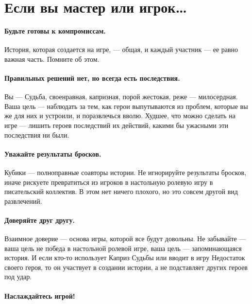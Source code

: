 \section*{Если вы мастер или игрок…}

\paragraph{Будьте готовы к компромиссам.} История, которая создается на игре, — общая, и каждый участник — ее равно важная часть. Помните об этом.
\paragraph{Правильных решений нет, но всегда есть последствия.} Вы — Судьба, своенравная, капризная, порой жестокая, реже — милосердная. Ваша цель — наблюдать за тем, как герои выпутываются из проблем, которые вы же для них и устроили, и поразвлечься вволю. Худшее, что можно сделать на игре — лишить героев последствий их действий, какими бы ужасными эти последствия ни были.
\paragraph{Уважайте результаты бросков.} Кубики — полноправные соавторы истории. Не игнорируйте результаты бросков, иначе рискуете превратиться из игроков в настольную ролевую игру в писательский коллектив. В этом нет ничего плохого, но это совсем другой вид развлечений.
\paragraph{Доверяйте друг другу.} Взаимное доверие — основа игры, которой все будут довольны. Не забывайте — ваша цель не победа в настольной ролевой игре, ваша цель — запоминающаяся история. И если кто-то использует Каприз Судьбы или вводит в игру Недостаток своего героя, то он участвует в создании истории, а не подставляет других героев под удар.
\paragraph{Наслаждайтесь игрой!}